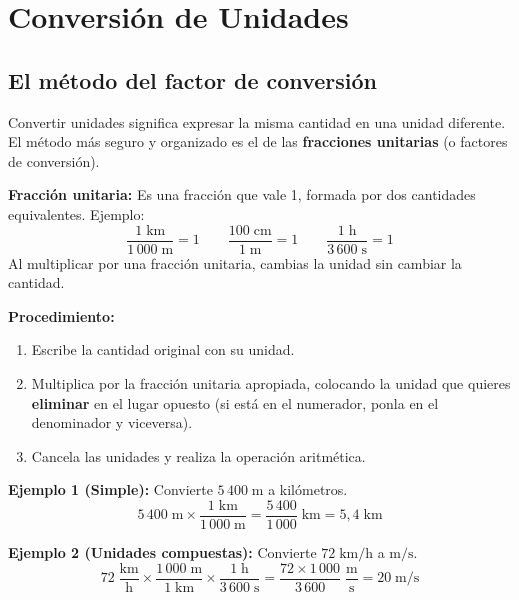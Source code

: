 \documentclass[12pt, letterpaper]{article}
\begin{document}

\section{Conversión de Unidades}

\subsection{El método del factor de conversión}

Convertir unidades significa expresar la misma cantidad en una unidad diferente. El método más seguro y organizado es el de las \textbf{fracciones unitarias} (o factores de conversión).

\begin{cuadroteoria}
  \textbf{Fracción unitaria:} Es una fracción que vale 1, formada por dos cantidades equivalentes. Ejemplo:
  $$\frac{1\;\text{km}}{1\,000\;\text{m}} = 1 \qquad \frac{100\;\text{cm}}{1\;\text{m}} = 1 \qquad \frac{1\;\text{h}}{3\,600\;\text{s}} = 1$$
  Al multiplicar por una fracción unitaria, cambias la unidad sin cambiar la cantidad.
\end{cuadroteoria}

\newpage

\begin{cuadrosolucion}
  \textbf{Procedimiento:}
  \begin{enumerate}[leftmargin=*]
    \item Escribe la cantidad original con su unidad.
    \item Multiplica por la fracción unitaria apropiada, colocando la unidad que quieres \textbf{eliminar} en el lugar opuesto (si está en el numerador, ponla en el denominador y viceversa).
    \item Cancela las unidades y realiza la operación aritmética.
  \end{enumerate}
\end{cuadrosolucion}

\noindent\textbf{Ejemplo 1 (Simple):} Convierte $5\,400\;\text{m}$ a kilómetros.
$$5\,400\;\text{m} \times \frac{1\;\text{km}}{1\,000\;\text{m}} = \frac{5\,400}{1\,000}\;\text{km} = 5{,}4\;\text{km}$$

\noindent\textbf{Ejemplo 2 (Unidades compuestas):} Convierte $72\;\text{km/h}$ a $\text{m/s}$.
$$72\;\frac{\text{km}}{\text{h}} \times \frac{1\,000\;\text{m}}{1\;\text{km}} \times \frac{1\;\text{h}}{3\,600\;\text{s}} = \frac{72 \times 1\,000}{3\,600}\;\frac{\text{m}}{\text{s}} = 20\;\text{m/s}$$
\end{document}
